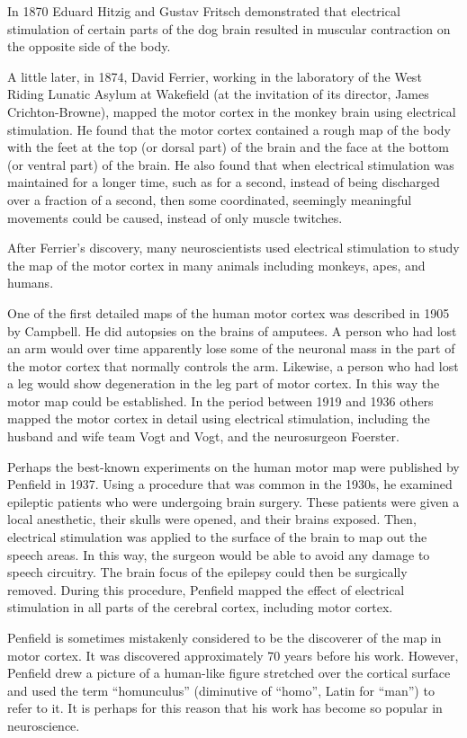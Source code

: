 In 1870 Eduard Hitzig and Gustav Fritsch demonstrated that electrical stimulation of certain parts of the dog brain resulted in muscular contraction on the opposite side of the body.

A little later, in 1874, David Ferrier, working in the laboratory of the West Riding Lunatic Asylum at Wakefield (at the invitation of its director, James Crichton-Browne), mapped the motor cortex in the monkey brain using electrical stimulation. He found that the motor cortex contained a rough map of the body with the feet at the top (or dorsal part) of the brain and the face at the bottom (or ventral part) of the brain. He also found that when electrical stimulation was maintained for a longer time, such as for a second, instead of being discharged over a fraction of a second, then some coordinated, seemingly meaningful movements could be caused, instead of only muscle twitches.

After Ferrier's discovery, many neuroscientists used electrical stimulation to study the map of the motor cortex in many animals including monkeys, apes, and humans.

One of the first detailed maps of the human motor cortex was described in 1905 by Campbell. He did autopsies on the brains of amputees. A person who had lost an arm would over time apparently lose some of the neuronal mass in the part of the motor cortex that normally controls the arm. Likewise, a person who had lost a leg would show degeneration in the leg part of motor cortex. In this way the motor map could be established. In the period between 1919 and 1936 others mapped the motor cortex in detail using electrical stimulation, including the husband and wife team Vogt and Vogt, and the neurosurgeon Foerster.

Perhaps the best-known experiments on the human motor map were published by Penfield in 1937. Using a procedure that was common in the 1930s, he examined epileptic patients who were undergoing brain surgery. These patients were given a local anesthetic, their skulls were opened, and their brains exposed. Then, electrical stimulation was applied to the surface of the brain to map out the speech areas. In this way, the surgeon would be able to avoid any damage to speech circuitry. The brain focus of the epilepsy could then be surgically removed. During this procedure, Penfield mapped the effect of electrical stimulation in all parts of the cerebral cortex, including motor cortex.

Penfield is sometimes mistakenly considered to be the discoverer of the map in motor cortex. It was discovered approximately 70 years before his work. However, Penfield drew a picture of a human-like figure stretched over the cortical surface and used the term ``homunculus'' (diminutive of ``homo'', Latin for ``man'') to refer to it. It is perhaps for this reason that his work has become so popular in neuroscience.

